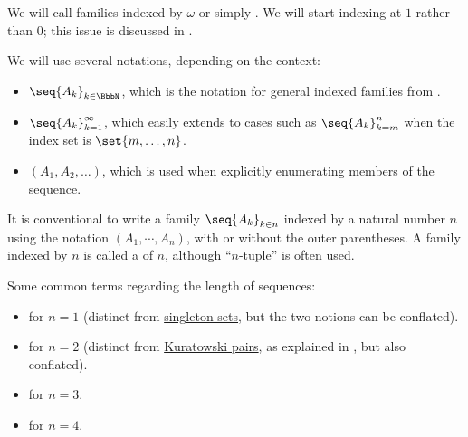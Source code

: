 \begin{definition}\label{def:sequence}\mimprovised
  We will call families indexed by \( \omega \)  or simply . We will start indexing at \( 1 \) rather than \( 0 \); this issue is discussed in .

  We will use several notations, depending on the context:
  \begin{itemize}
    \item \( \seq{ A_k }_{k \in \BbbN} \), which is the notation for general indexed families from .
    \item \( \seq{ A_k }_{k=1}^\infty \), which easily extends to cases such as \( \seq{ A_k }_{k=m}^n \) when the index set is \( \set{ m, \ldots, n } \).
    \item \( (A_1, A_2, \ldots) \), which is used when explicitly enumerating members of the sequence.
  \end{itemize}

  It is conventional to write a family \( \seq{ A_k }_{k \in n} \) indexed by a natural number \( n \) using the notation \( (A_1, \cdots, A_n) \), with or without the outer parentheses. A family indexed by \( n \) is called a  of  \( n \), although \enquote{\( n \)-tuple} is often used.

  Some common terms regarding the length of sequences:
  \begin{itemize}
    \item {} for \( n = 1 \) (distinct from \hyperref[rem:singleton_sets]{singleton sets}, but the two notions can be conflated).
    \item {} for \( n = 2 \) (distinct from \hyperref[def:cartesian_product/kuratowski_pair]{Kuratowski pairs}, as explained in , but also conflated).
    \item {} for \( n = 3 \).
    \item {} for \( n = 4 \).
  \end{itemize}
\end{definition}

